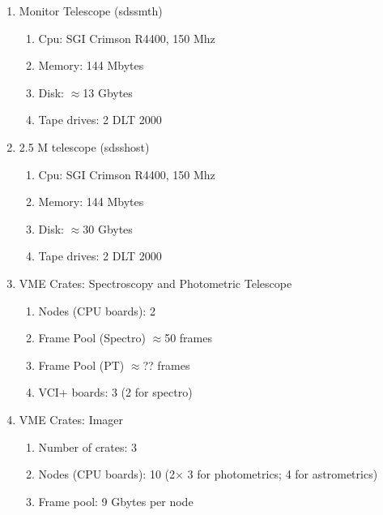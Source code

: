 \begin{enumerate}
\item Monitor Telescope (sdssmth)

\begin{enumerate}
\item Cpu: SGI Crimson R4400, 150 Mhz

\item Memory: 144 Mbytes

\item Disk: $\approx$13 Gbytes

\item Tape drives: 2 DLT 2000
\end{enumerate}

\item 2.5 M telescope (sdsshost)

\begin{enumerate}
\item Cpu: SGI Crimson R4400, 150 Mhz

\item Memory: 144 Mbytes

\item Disk: $\approx$30 Gbytes

\item Tape drives: 2 DLT 2000
\end{enumerate}

\item VME Crates: Spectroscopy and Photometric Telescope
\begin{enumerate}

\item Nodes (CPU boards): 2

\item Frame Pool (Spectro) $\approx$50 frames

\item Frame Pool (PT) $\approx$?? frames

\item VCI+ boards: 3 (2 for spectro)
\end{enumerate}


\item VME Crates: Imager
\begin{enumerate}

\item Number of crates: 3

\item Nodes (CPU boards): 10 (2$\times$ 3 for photometrics; 4 for astrometrics)

\item Frame pool: 9 Gbytes per node


\end{enumerate}
\end{enumerate}
